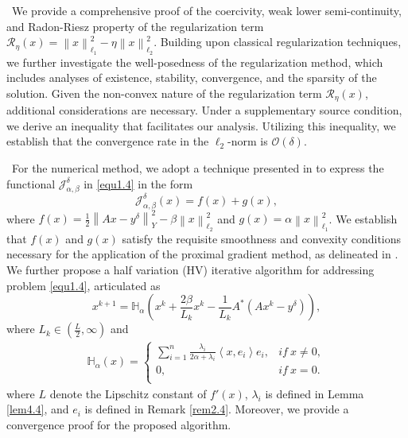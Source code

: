 \documentclass[a4paper,12pt]{article}
\numberwithin{equation}{section}
\begin{document}
\textbullet\ We provide a comprehensive proof of the coercivity, weak lower semi-continuity, and Radon-Riesz property of the regularization term $\mathcal{R}_{\eta}(x)=\left\|x\right\|_{\ell_{1}}^{2}-\eta\left\|x\right\|_{\ell_{2}}^{2}$. Building upon classical regularization techniques, we further investigate the well-posedness of the regularization method, which includes analyses of existence, stability, convergence, and the sparsity of the solution. Given the non-convex nature of the regularization term $\mathcal{R}_{\eta}(x)$, additional considerations are necessary. Under a supplementary source condition, we derive an inequality that facilitates our analysis. Utilizing this inequality, we establish that the convergence rate in the $\ell_{2}$-norm is $\mathcal{O}(\delta)$.

\textbullet\ For the numerical method, we adopt a technique presented in \cite{BA17} to express the functional $\mathcal{J}_{\alpha,\beta}^{\delta}$ in \eqref{equ1.4} in the form
\begin{equation*}
  \mathcal{J}_{\alpha,\beta}^{\delta}\left(x\right)=f\left(x\right)+g\left(x\right),
\end{equation*}
where $f\left(x\right)=\frac{1}{2}\left\|Ax-y^{\delta}\right\|_{Y}^{2} -\beta\left\|x\right\|_{\ell_{2}}^{2}$ and $g\left(x\right)=\alpha\left\|x\right\|_{\ell_{1}}^{2}$. We establish that $f\left(x\right)$ and $g\left(x\right)$  satisfy the requisite smoothness and convexity conditions necessary for the application of the proximal gradient method, as delineated in \cite{BA17}. We further propose a half variation (HV) iterative algorithm for addressing problem \eqref{equ1.4}, articulated as
\begin{equation*}
    x^{k+1}=\mathbb{H}_{\alpha}\left(x^{k}+ \frac{2\beta}{L_{k}} x^{k}- \frac{1}{L_{k}}A^{*}\left(Ax^{k}-y^{\delta}\right)\right),
\end{equation*}
where $L_{k}\in (\frac{L}{2},\infty)$ and
\begin{align*}
    \mathbb{H}_{\alpha}(x)=
    \left\{           
             \begin{array}{ll}
             \sum_{i=1}^{n}\frac{\lambda_{i}}{2\alpha+\lambda_{i}}\left<x, e_{i}\right>e_{i}, & if \ x\neq 0, \\
             0, & if \ x= 0. \\
             \end{array}
    \right.
\end{align*}
where $L$ denote the Lipschitz constant of $f'\left(x\right)$, $\lambda_{i}$ is defined in Lemma \ref{lem4.4}, and $e_{i}$ is defined
in Remark \ref{rem2.4}. Moreover, we provide a convergence proof for the proposed algorithm.
\end{document}
